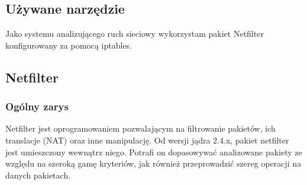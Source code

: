 \documentclass[a4paper,10pt,twoside]{book}
\begin{document}
		\subsection{Używane narzędzie}
			Jako systemu analizującego ruch sieciowy wykorzystam pakiet Netfilter konfigurowany za pomocą iptables.
		\subsection{Netfilter}
			\subsubsection{Ogólny zarys}
				Netfilter jest oprogramowaniem pozwalającym na filtrowanie pakietów, ich translacje (NAT) oraz inne manipulację.
				Od wersji jądra 2.4.x, pakiet netfilter jest umieszczony wewnątrz niego.
				Potrafi on dopasowywać analizowane pakiety ze względu na szeroką gamę kryteriów, jak również przeprowadzić szereg operacji na danych pakietach.
\end{document}
